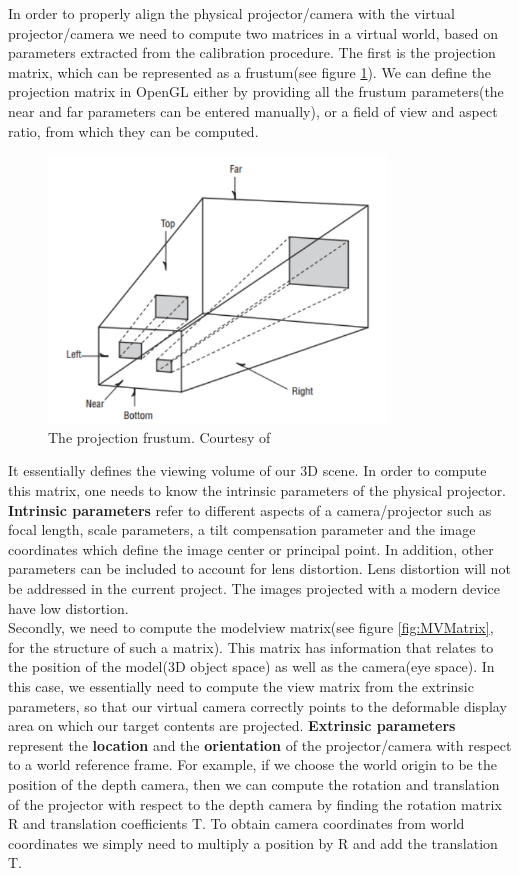 \documentclass[]{article}
\begin{document}
In order to properly align the physical projector/camera with the virtual projector/camera we need to compute two matrices in a virtual world, based on parameters extracted from the calibration procedure. The first is the projection matrix, which can be represented as a frustum(see figure \ref{fig:Frustum}). We can define the projection matrix in OpenGL either by providing all the frustum parameters(the near and far parameters can be entered manually), or a field of view and aspect ratio, from which they can be computed. 
\begin{figure}[hbtp]
    \centering
    \includegraphics[width=0.8\textwidth]{figures/Frustum.PNG}
    \caption{The projection frustum. Courtesy of \cite{superbible}}
    \label{fig:Frustum}
\end{figure}

It essentially defines the viewing volume of our 3D scene. In order to compute this matrix, one needs to know the intrinsic parameters of the physical projector.
\textbf{Intrinsic parameters} refer to different aspects of a camera/projector such as focal length, scale parameters, a tilt compensation parameter and the image coordinates which define the image center or principal point. In addition, other parameters can be included to account for lens distortion. Lens distortion will not be addressed in the current project. The images projected with a modern device have low distortion.\\

Secondly, we need to compute the modelview matrix(see figure \ref{fig:MVMatrix}, for the structure of such a matrix). This matrix has information that relates to the position of the model(3D object space) as well as the camera(eye space). In this case, we essentially need to compute the view matrix from the extrinsic parameters, so that our virtual camera correctly points to the deformable display area on which our target contents are projected. \textbf{Extrinsic parameters} represent the \textbf{location} and the \textbf{orientation} of the projector/camera with respect to a world reference frame. For example, if we choose the world origin to be the position of the depth camera, then we can compute the rotation and translation of the projector with respect to the depth camera by finding the rotation matrix R and translation coefficients T. To obtain camera coordinates from world coordinates we simply need to multiply a position by R and add the translation T.
\end{document}
